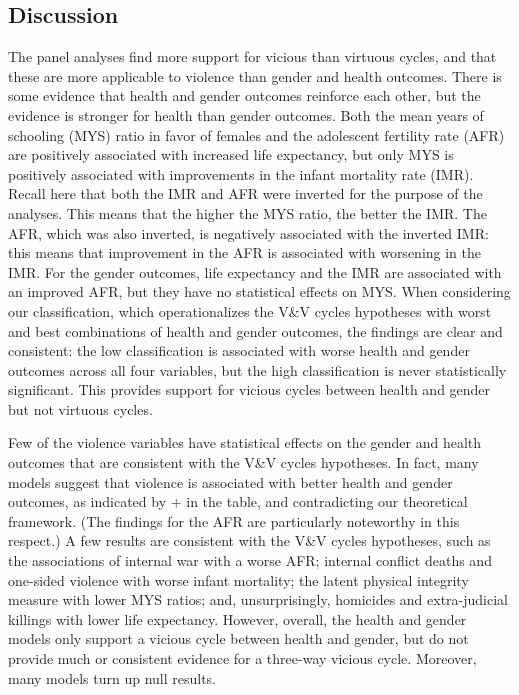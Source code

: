 \documentclass[12pt]{article}
\begin{document}
\subsection{Discussion}

The panel analyses find more support for vicious than virtuous cycles, and that these are more applicable to violence than gender and health outcomes.
There is some evidence that health and gender outcomes reinforce each other, but the evidence is stronger for health than gender outcomes. Both the mean years of schooling (MYS) ratio in favor of females and the adolescent fertility rate (AFR) are positively associated with increased life expectancy, but only MYS is positively associated with improvements in the infant mortality rate (IMR). Recall here that both the IMR and AFR were inverted for the purpose of the analyses. This means that the higher the MYS ratio, the better the IMR. The AFR, which was also inverted, is negatively associated with the inverted IMR: this means that improvement in the AFR is associated with worsening in the IMR. For the gender outcomes, life expectancy and the IMR are associated with an improved AFR, but they have no statistical effects on MYS. When considering our classification, which operationalizes the V\&V cycles hypotheses with worst and best combinations of health and gender outcomes, the findings are clear and consistent: the low classification is associated with worse health and gender outcomes across all four variables, but the high classification is never statistically significant. This provides support for vicious cycles between health and gender but not virtuous cycles.

Few of the violence variables have statistical effects on the gender and health outcomes that are  consistent with the V\&V cycles hypotheses. In fact, many models suggest that violence is associated with better health and gender outcomes, as indicated by $+$ in the table, and contradicting our theoretical framework. (The findings for the AFR are particularly noteworthy in this respect.) A few results are consistent with the V\&V cycles hypotheses, such as the associations of internal war with a worse AFR; internal conflict deaths and one-sided violence with worse infant mortality; the latent physical integrity measure with lower MYS ratios; and, unsurprisingly, homicides and extra-judicial killings with lower life expectancy. However, overall, the health and gender models only support a vicious cycle between health and gender, but do not provide much or consistent evidence for a three-way vicious cycle. Moreover, many models turn up null results.
\end{document}
